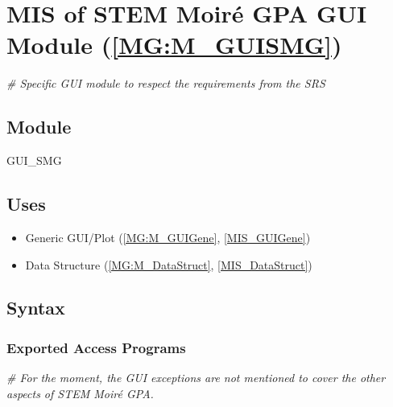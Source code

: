 \documentclass[12pt, titlepage]{article}
\newcommand{\progname}{STEM Moir{\'e} GPA}
\begin{document}

\section{MIS of STEM Moir{\'e} GPA GUI Module (\texorpdfstring{\cref{MG:M_GUISMG}}))} \label{MIS_GUISMG}

\noindent\textit{{\#} Specific GUI module to respect the requirements from the 
SRS}\medskip


\subsection{Module}
GUI{\_}SMG
\subsection{Uses}
\begin{itemize}
\item Generic GUI/Plot (\cref{MG:M_GUIGene}, \cref{MIS_GUIGene})
\item Data Structure (\cref{MG:M_DataStruct}, \cref{MIS_DataStruct})
\end{itemize}

\subsection{Syntax}

\subsubsection{Exported Access Programs}

\noindent\textit{{\#} For the moment, the GUI exceptions are not mentioned to 
cover the other aspects of \progname{}.}\medskip
\end{document}
